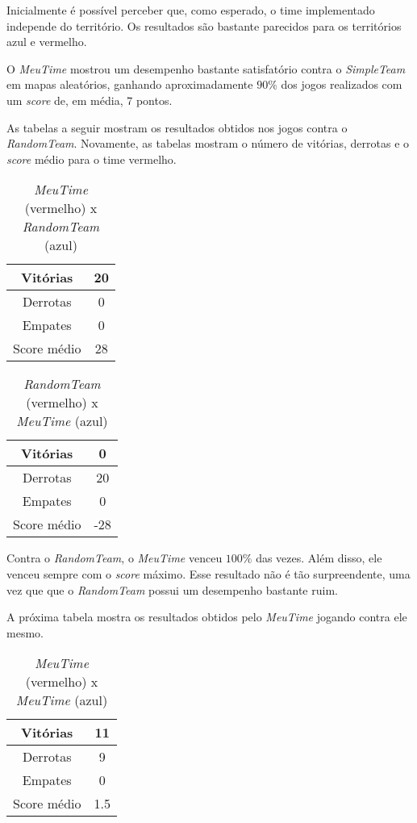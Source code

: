 \documentclass[a4paper,12pt]{article}
\begin{document}
Inicialmente é possível perceber que, como esperado, o time implementado independe do
território. Os resultados são bastante parecidos para os territórios azul e vermelho.

O \textit{MeuTime} mostrou um desempenho bastante satisfatório contra o \textit{SimpleTeam}
em mapas aleatórios, ganhando aproximadamente $90\%$ dos jogos realizados com
um \textit{score} de, em média, $7$ pontos.

As tabelas a seguir mostram os resultados obtidos nos jogos contra o \textit{RandomTeam}.
Novamente, as tabelas mostram o número de vitórias, derrotas e o \textit{score} médio
para o time vermelho.

\begin{table}[htb!]
    {\centering
    \begin{tabular}{|c|c|} \hline
    Vitórias     & 20 \\ \hline
    Derrotas     & 0  \\ \hline
    Empates      & 0  \\ \hline
    Score médio  & 28 \\ \hline
    \end{tabular}
    \caption{\textit{MeuTime} (vermelho) x \textit{RandomTeam} (azul)}
    }
\end{table}

\begin{table}[htb!]
    {\centering
    \begin{tabular}{|c|c|} \hline
    Vitórias     & 0   \\ \hline
    Derrotas     & 20  \\ \hline
    Empates      & 0   \\ \hline
    Score médio  & -28 \\ \hline
    \end{tabular}
    \caption{\textit{RandomTeam} (vermelho) x \textit{MeuTime} (azul)}
    }
\end{table}

Contra o \textit{RandomTeam}, o \textit{MeuTime} venceu $100\%$ das vezes. Além disso,
ele venceu sempre com o \textit{score} máximo. Esse resultado não é tão surpreendente,
uma vez que que o \textit{RandomTeam} possui um desempenho bastante ruim.

A próxima tabela mostra os resultados obtidos pelo \textit{MeuTime} jogando contra
ele mesmo.

\begin{table}[htb!]
    {\centering
    \begin{tabular}{|c|c|} \hline
    Vitórias     & 11  \\ \hline
    Derrotas     & 9   \\ \hline
    Empates      & 0   \\ \hline
    Score médio  & 1.5 \\ \hline
    \end{tabular}
    \caption{\textit{MeuTime} (vermelho) x \textit{MeuTime} (azul)}
    }
\end{table}
\end{document}
